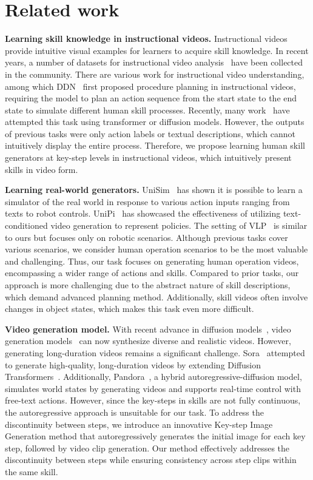 \section{Related work}
\label{sec:related work}

\textbf{Learning skill knowledge in instructional videos.} Instructional videos provide intuitive visual examples for learners to acquire skill knowledge. In recent years, a number of datasets for instructional video analysis~\cite{COIN,crosstask,MPII,Youcook,Youcook2,50salads,breakfast,EPIC-KITCHENS,assembly101,howto100m} have been collected in the community. There are various work for instructional video understanding, among which DDN~\cite{DDN} first proposed procedure planning in instructional videos, requiring the model to plan an action sequence from the start state to the end state to simulate different human skill processes. Recently, many work~\cite{plate,p3iv,PDPP,E3P} have attempted this task using transformer or diffusion models. However, the outputs of previous tasks were only action labels or textual descriptions, which cannot intuitively display the entire process. Therefore, we propose learning human skill generators at key-step levels in instructional videos, which intuitively present skills in video form.

\noindent\textbf{Learning real-world generators.} UniSim~\cite{unisim} has shown it is possible to learn a simulator of the real world in response to various action inputs ranging from texts to robot controls. UniPi~\cite{unipi} has showcased the effectiveness of utilizing text-conditioned video generation to represent policies. The setting of VLP~\cite{VLP} is similar to ours but focuses only on robotic scenarios. Although previous tasks cover various scenarios, we consider human operation scenarios to be the most valuable and challenging. Thus, our task focuses on generating human operation videos, encompassing a wider range of actions and skills. Compared to prior tasks, our approach is more challenging due to the abstract nature of skill descriptions, which demand advanced planning method. Additionally, skill videos often involve changes in object states, which makes this task even more difficult.


\noindent\textbf{Video generation model.} With recent advance in diffusion models~\cite{ddpm,ldm}, video generation models~\cite{SVD,aa,AnimateDiff,latte,dynamicrafter} can now synthesize diverse and realistic videos. However, generating long-duration videos remains a significant challenge. Sora~\cite{sora} attempted to generate high-quality, long-duration videos by extending Diffusion Transformers~\cite{dit}. Additionally, Pandora~\cite{pandora}, a hybrid autoregressive-diffusion model, simulates world states by generating videos and supports real-time control with free-text actions. However, since the key-steps in skills are not fully continuous, the autoregressive approach is unsuitable for our task. To address the discontinuity between steps, we introduce an innovative Key-step Image Generation method that autoregressively generates the initial image for each key step, followed by video clip generation. Our method effectively addresses the discontinuity between steps while ensuring consistency across step clips within the same skill.
